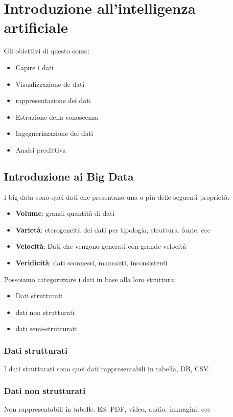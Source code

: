 \section{Introduzione all'intelligenza artificiale}

Gli obiettivi di questo corso:
\begin{itemize}
    \item Capire i dati
    \item Visualizzazione de dati
    \item rappresentazione dei dati
    \item Estrazione della conoscenza
    \item Ingegnerizzazione dei dati
    \item Analsi predittiva
\end{itemize}

\subsection{Introduzione ai Big Data}
I big data sono quei dati che presentano una o più delle seguenti proprietà:
\begin{itemize}
    \item \textbf{Volume}: grandi quantità di dati
    \item \textbf{Varietà}: eterogeneità dei dati per tipologia, struttura, fonte, ecc
    \item \textbf{Velocità}: Dati che vengono generati con grande velocità
    \item \textbf{Veridicità}: dati sconnessi, mancanti, inconsistenti
\end{itemize}

Possoiamo categorizzare i dati in base alla loro struttura:
\begin{itemize}
    \item Dati strutturati
    \item dati non strutturati
    \item dati semi-strutturati
\end{itemize}

\subsubsection{Dati strutturati}
I dati strutturati sono quei dati rappresentabili in tabella, DB, CSV.
\subsubsection{Dati non strutturati}
Non rappresentabili in tabelle.
ES:
PDF, video, audio, immagini, ecc

